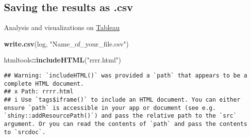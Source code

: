 \documentclass[
]{article}
\newenvironment{Shaded}{\begin{snugshade}}{\end{snugshade}}
\newcommand{\FunctionTok}[1]{\textcolor[rgb]{0.13,0.29,0.53}{\textbf{#1}}}
\newcommand{\NormalTok}[1]{#1}
\newcommand{\SpecialCharTok}[1]{\textcolor[rgb]{0.81,0.36,0.00}{\textbf{#1}}}
\newcommand{\StringTok}[1]{\textcolor[rgb]{0.31,0.60,0.02}{#1}}
\begin{document}
\hypertarget{saving-the-results-as-.csv}{%
\subsection{Saving the results as
.csv}\label{saving-the-results-as-.csv}}

Analysis and visualizations on
\href{https://public.tableau.com/views/InternationalMathematicalOlympiadDataCategoryandDifficulty/Dashboard1?:language=en-GB\&:sid=\&:display_count=n\&:origin=viz_share_link}{Tableau}

\begin{Shaded}
\begin{Highlighting}[]
\FunctionTok{write.csv}\NormalTok{(log, }\StringTok{"Name\_of\_your\_file.csv"}\NormalTok{)}
\end{Highlighting}
\end{Shaded}

\begin{Shaded}
\begin{Highlighting}[]
\NormalTok{htmltools}\SpecialCharTok{::}\FunctionTok{includeHTML}\NormalTok{(}\StringTok{"rrrr.html"}\NormalTok{)}
\end{Highlighting}
\end{Shaded}

\begin{verbatim}
## Warning: `includeHTML()` was provided a `path` that appears to be a complete HTML document.
## x Path: rrrr.html
## i Use `tags$iframe()` to include an HTML document. You can either ensure `path` is accessible in your app or document (see e.g. `shiny::addResourcePath()`) and pass the relative path to the `src` argument. Or you can read the contents of `path` and pass the contents to `srcdoc`.
\end{verbatim}
\end{document}

